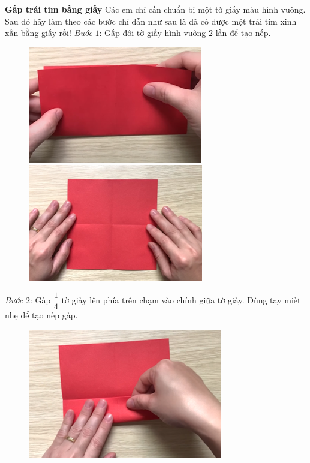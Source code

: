 \begin{multicols}{2}
	\textbf{\color{toancuabi}Gấp trái tim bằng giấy}
	\vskip 0.1cm
	Các em chỉ cần chuẩn bị một tờ giấy màu hình vuông. Sau đó hãy làm theo các bước chỉ dẫn như sau là đã có được một trái tim xinh xắn bằng giấy rồi!
	\vskip 0.1cm
	\textit{Bước} $1$: Gấp đôi tờ giấy hình vuông $2$ lần để tạo nếp. 
	\begin{figure}[H]
			\vspace*{-5pt}
			\centering
			\captionsetup{labelformat= empty, justification=centering}
			\includegraphics[height= 0.327\linewidth]{20}
			\includegraphics[height= 0.327\linewidth]{21}
			\vspace*{-10pt}
		\end{figure}
	\textit{Bước} $2$: Gấp $\dfrac{1}{4}$ tờ giấy lên phía trên chạm vào chính giữa tờ giấy. Dùng tay miết nhẹ để tạo nếp gấp.
	\begin{figure}[H]
			\vspace*{-5pt}
			\centering
			\captionsetup{labelformat= empty, justification=centering}
			\includegraphics[width= 1\linewidth]{22}

\end{figure}
\end{multicols}
